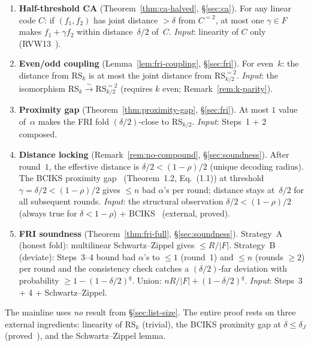 \documentclass[11pt]{article}
\newcommand{\RS}{\mathrm{RS}}
\begin{document}
\begin{enumerate}[label=\textbf{Step \arabic*.}, leftmargin=2.2em]

\item \textbf{Half-threshold CA} (Theorem~\ref{thm:ca-halved}, \S\ref{sec:ca}). For any linear code $C$: if $(f_1, f_2)$ has joint distance $> \delta$ from $C^{=2}$, at most one $\gamma \in F$ makes $f_1 + \gamma f_2$ within distance~$\delta/2$ of~$C$. \emph{Input}: linearity of $C$ only (RVW13~\cite{RVW}).

\item \textbf{Even/odd coupling} (Lemma~\ref{lem:fri-coupling}, \S\ref{sec:fri}). For even~$k$: the distance from $\RS_k$ is at most the joint distance from $\RS_{k/2}^{=2}$. \emph{Input}: the isomorphism $\RS_k \xrightarrow{\sim} \RS_{k/2}^{=2}$ (requires $k$ even; Remark~\ref{rem:k-parity}).

\item \textbf{Proximity gap} (Theorem~\ref{thm:proximity-gap}, \S\ref{sec:fri}). At most $1$ value of~$\alpha$ makes the FRI fold $(\delta/2)$-close to $\RS_{k/2}$. \emph{Input}: Steps~1 + 2 composed.

\item \textbf{Distance locking} (Remark~\ref{rem:no-compound}, \S\ref{sec:soundness}). After round~$1$, the effective distance is $\delta/2 < (1{-}\rho)/2$ (unique decoding radius). The BCIKS proximity gap~\cite{BCIKS} (Theorem~1.2, Eq.~(1.1)) at threshold $\gamma = \delta/2 < (1{-}\rho)/2$ gives $\leq n$ bad $\alpha$'s per round; distance stays at~$\delta/2$ for all subsequent rounds. \emph{Input}: the structural observation $\delta/2 < (1{-}\rho)/2$ (always true for $\delta < 1{-}\rho$) + BCIKS~\cite{BCIKS} (external, proved).

\item \textbf{FRI soundness} (Theorem~\ref{thm:fri-full}, \S\ref{sec:soundness}). Strategy~A (honest fold): multilinear Schwartz--Zippel gives $\leq R/|F|$. Strategy~B (deviate): Steps~3--4 bound bad $\alpha$'s to $\leq 1$ (round~1) and $\leq n$ (rounds $\geq 2$) per round and the consistency check catches a $(\delta/2)$-far deviation with probability $\geq 1 - (1{-}\delta/2)^q$. Union: $nR/|F| + (1{-}\delta/2)^q$. \emph{Input}: Steps~3 + 4 + Schwartz--Zippel.
\end{enumerate}

The mainline uses \emph{no} result from \S\ref{sec:list-size}. The entire proof rests on three external ingredients: linearity of $\RS_k$ (trivial), the BCIKS proximity gap at $\delta \leq \delta_J$ (proved~\cite{BCIKS}), and the Schwartz--Zippel lemma.
\end{document}
